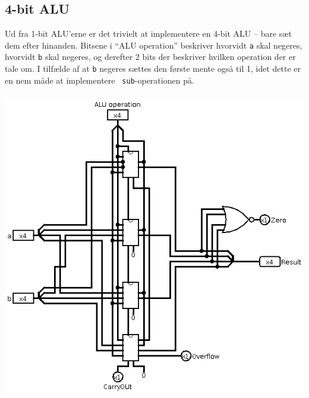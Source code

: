 \subsection{4-bit ALU}
Ud fra 1-bit ALU'erne er det trivielt at implementere en 4-bit ALU -- bare sæt
dem efter hinanden. Bitsene i ``ALU operation'' beskriver hvorvidt {\tt a} skal
negeres, hvorvidt {\tt b} skal negeres, og derefter 2 bits der beskriver hvilken
operation der er tale om. I tilfælde af at {\tt b} negeres sættes den første
mente også til 1, idet dette er en nem måde at implementere {\tt
sub}-operationen på. \\
\\
\includegraphics{Billeder/4bit-ALU.png}
